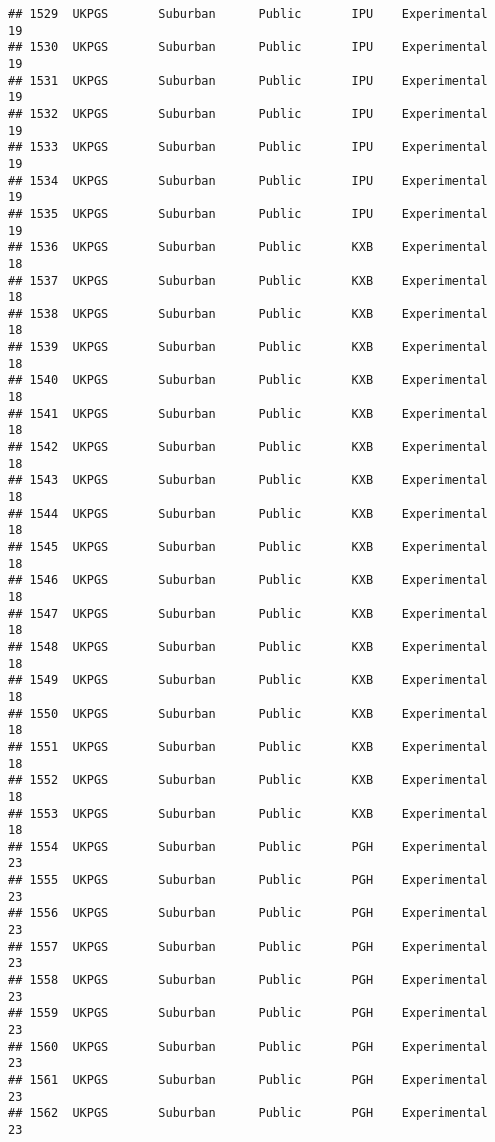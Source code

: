 \documentclass[
]{article}
\begin{document}
\begin{verbatim}
## 1529  UKPGS       Suburban      Public       IPU    Experimental        19
## 1530  UKPGS       Suburban      Public       IPU    Experimental        19
## 1531  UKPGS       Suburban      Public       IPU    Experimental        19
## 1532  UKPGS       Suburban      Public       IPU    Experimental        19
## 1533  UKPGS       Suburban      Public       IPU    Experimental        19
## 1534  UKPGS       Suburban      Public       IPU    Experimental        19
## 1535  UKPGS       Suburban      Public       IPU    Experimental        19
## 1536  UKPGS       Suburban      Public       KXB    Experimental        18
## 1537  UKPGS       Suburban      Public       KXB    Experimental        18
## 1538  UKPGS       Suburban      Public       KXB    Experimental        18
## 1539  UKPGS       Suburban      Public       KXB    Experimental        18
## 1540  UKPGS       Suburban      Public       KXB    Experimental        18
## 1541  UKPGS       Suburban      Public       KXB    Experimental        18
## 1542  UKPGS       Suburban      Public       KXB    Experimental        18
## 1543  UKPGS       Suburban      Public       KXB    Experimental        18
## 1544  UKPGS       Suburban      Public       KXB    Experimental        18
## 1545  UKPGS       Suburban      Public       KXB    Experimental        18
## 1546  UKPGS       Suburban      Public       KXB    Experimental        18
## 1547  UKPGS       Suburban      Public       KXB    Experimental        18
## 1548  UKPGS       Suburban      Public       KXB    Experimental        18
## 1549  UKPGS       Suburban      Public       KXB    Experimental        18
## 1550  UKPGS       Suburban      Public       KXB    Experimental        18
## 1551  UKPGS       Suburban      Public       KXB    Experimental        18
## 1552  UKPGS       Suburban      Public       KXB    Experimental        18
## 1553  UKPGS       Suburban      Public       KXB    Experimental        18
## 1554  UKPGS       Suburban      Public       PGH    Experimental        23
## 1555  UKPGS       Suburban      Public       PGH    Experimental        23
## 1556  UKPGS       Suburban      Public       PGH    Experimental        23
## 1557  UKPGS       Suburban      Public       PGH    Experimental        23
## 1558  UKPGS       Suburban      Public       PGH    Experimental        23
## 1559  UKPGS       Suburban      Public       PGH    Experimental        23
## 1560  UKPGS       Suburban      Public       PGH    Experimental        23
## 1561  UKPGS       Suburban      Public       PGH    Experimental        23
## 1562  UKPGS       Suburban      Public       PGH    Experimental        23

\end{verbatim}
\end{document}
